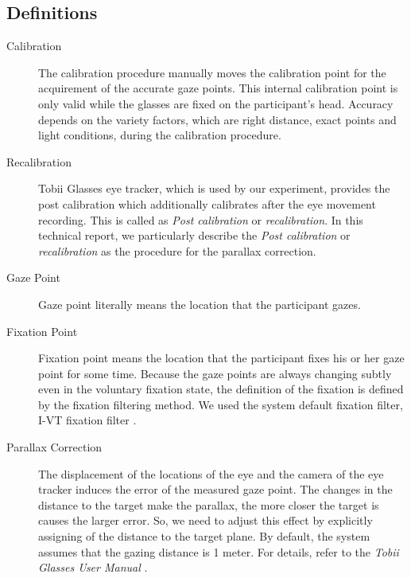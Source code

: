 \documentclass{article}
\begin{document}
\subsection{Definitions}
\label{definitions}
\begin{description}

\item[Calibration]
The calibration procedure manually moves the calibration point for the acquirement of the accurate gaze points. This internal calibration point is only valid while the glasses are fixed on the participant's head. Accuracy depends on the variety factors, which are right distance, exact points and light conditions, during the calibration procedure.

\item[Recalibration]
Tobii Glasses eye tracker, which is used by our experiment, provides the post calibration which additionally calibrates after the eye movement recording. This is called as \textit{Post calibration} or \textit{recalibration}. In this technical report, we particularly describe the \textit{Post calibration} or \textit{recalibration} as the procedure for the parallax correction.

\item[Gaze Point]
Gaze point literally means the location that the participant gazes.

\item[Fixation Point]
Fixation point means the location that the participant fixes his or her gaze point for some time. Because the gaze points are always changing subtly even in the voluntary fixation state, the definition of the fixation is defined by the fixation filtering method. We used the system default fixation filter, I-VT fixation filter \citep{Salvucci2000}.

\item[Parallax Correction]
The displacement of the locations of the eye and the camera of the eye tracker induces the error of the measured gaze point. The changes in the distance to the target make the parallax, the more closer the target is causes the larger error. So, we need to adjust this effect by explicitly assigning of the distance to the target plane. By default, the system assumes that the gazing distance is 1 meter. For details, refer to the \textit{Tobii Glasses User Manual} \citep{tobii_manual}.

\end{description} 
 
\end{document}
